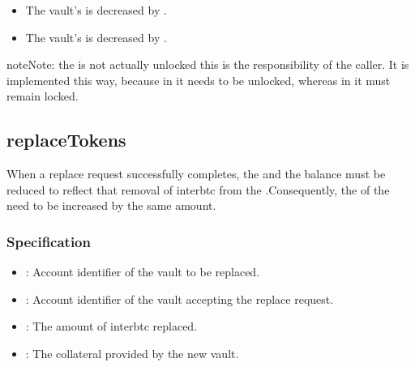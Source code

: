 \documentclass[a4paper,10pt,english]{sphinxmanual}
\begin{document}
\begin{itemize}
\item {} 
The vault’s  is decreased by .

\item {} 
The vault’s  is decreased by .

\end{itemize}

\begin{sphinxadmonition}{note}{Note:}
the  is not actually unlocked \sphinxhyphen{} this is the responsibility of the caller. It is implemented this way, because in {\hyperref[\detokenize{spec/redeem:requestredeem}]{}} it needs to be unlocked, whereas in {\hyperref[\detokenize{spec/replace:requestreplace}]{}} it must remain locked.
\end{sphinxadmonition}


\subsection{replaceTokens}
\label{\detokenize{spec/vault-registry:replacetokens}}\label{\detokenize{spec/vault-registry:id33}}
When a replace request successfully completes, the  and the  balance must be reduced to reflect that removal of interbtc from the .Consequently, the  of the  need to be increased by the same amount.


\subsubsection{Specification}
\label{\detokenize{spec/vault-registry:id34}}


\begin{itemize}
\item {} 
: Account identifier of the vault to be replaced.

\item {} 
: Account identifier of the vault accepting the replace request.

\item {} 
: The amount of interbtc replaced.

\item {} 
: The collateral provided by the new vault.

\end{itemize}
\end{document}
